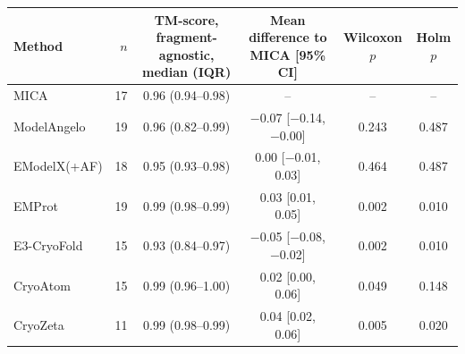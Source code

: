 \begin{tabular}{lrcccc}
\toprule
Method & $n$ & TM-score, fragment-agnostic, median (IQR) & Mean difference to MICA [95\% CI] & Wilcoxon $p$ & Holm $p$ \\
\midrule
MICA & 17 & 0.96 (0.94--0.98) & -- & -- & -- \\
ModelAngelo & 19 & 0.96 (0.82--0.99) & $-$0.07 [$-$0.14, $-$0.00] & 0.243 & 0.487 \\
EModelX(+AF) & 18 & 0.95 (0.93--0.98) & 0.00 [$-$0.01, 0.03] & 0.464 & 0.487 \\
EMProt & 19 & 0.99 (0.98--0.99) & 0.03 [0.01, 0.05] & 0.002 & 0.010 \\
E3-CryoFold & 15 & 0.93 (0.84--0.97) & $-$0.05 [$-$0.08, $-$0.02] & 0.002 & 0.010 \\
CryoAtom & 15 & 0.99 (0.96--1.00) & 0.02 [0.00, 0.06] & 0.049 & 0.148 \\
CryoZeta & 11 & 0.99 (0.98--0.99) & 0.04 [0.02, 0.06] & 0.005 & 0.020 \\
\bottomrule
\end{tabular}

